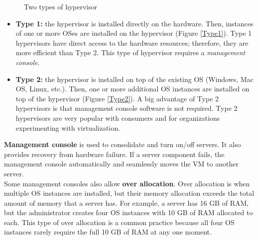 \begin{figure}[hbtp]
\caption{Two types of hypervisor}
\centering
{}
\end{figure}


\begin{itemize}
\item \textbf{Type 1:} the hypervisor is installed directly on the hardware. Then, instances of one or more OSes are installed on the hypervisor (Figure \ref{Type1}). Type 1 hypervisors have direct access to the hardware resources; therefore, they are more efficient than Type 2. This type of hypervisor requires a \emph{management console}.

\item \textbf{Type 2:} the hypervisor is installed on top of the existing OS (Windows, Mac OS, Linux, etc.). Then, one or more additional OS instances are installed on top of the hypervisor (Figure \ref{Type2}). A big advantage of Type 2 hypervisors is that management console software is not required. Type 2 hypervisors are very popular with consumers and for organizations experimenting with virtualization.
\end{itemize}

\textbf{Management console} is used to consolidate and turn on/off servers. It also provides recovery from hardware failure. If a server component fails, the management console automatically and seamlessly moves the VM to another server. \\

Some management consoles also allow \textbf{over allocation}. Over allocation is when multiple OS instances are installed, but their memory allocation exceeds the total amount of memory that a server has. For example, a server has 16 GB of RAM, but the administrator creates four OS instances with 10 GB of RAM allocated to each. This type of over allocation is a common practice because all four OS instances rarely require the full 10 GB of RAM at any one moment.

